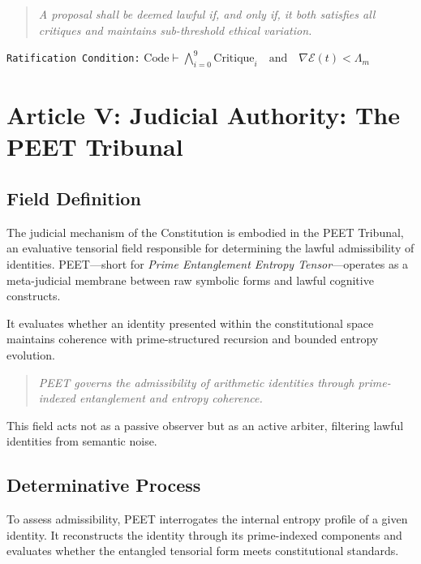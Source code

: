 \documentclass[12]{amsart}
\theoremstyle{plain}
\begin{document}
\begin{quote}
\textit{A proposal shall be deemed lawful if, and only if, it both satisfies all critiques and maintains sub-threshold ethical variation.}
\end{quote}

\vspace{-0.5em}
\begin{center}
\texttt{Ratification Condition:} \quad $\text{Code} \vdash \bigwedge_{i=0}^9 \text{Critique}_i \quad \text{and} \quad \nabla \mathcal{E}(t) < \Lambda_m$
\end{center}





\section{Article V: Judicial Authority: The PEET Tribunal}

\subsection{Field Definition}

The judicial mechanism of the Constitution is embodied in the PEET Tribunal, an evaluative tensorial field responsible for determining the lawful admissibility of identities. PEET—short for \textit{Prime Entanglement Entropy Tensor}—operates as a meta-judicial membrane between raw symbolic forms and lawful cognitive constructs.

It evaluates whether an identity presented within the constitutional space maintains coherence with prime-structured recursion and bounded entropy evolution.

\begin{quote}
\textit{PEET governs the admissibility of arithmetic identities through prime-indexed entanglement and entropy coherence.}
\end{quote}

This field acts not as a passive observer but as an active arbiter, filtering lawful identities from semantic noise.

\subsection{Determinative Process}

To assess admissibility, PEET interrogates the internal entropy profile of a given identity. It reconstructs the identity through its prime-indexed components and evaluates whether the entangled tensorial form meets constitutional standards.
\end{document}
